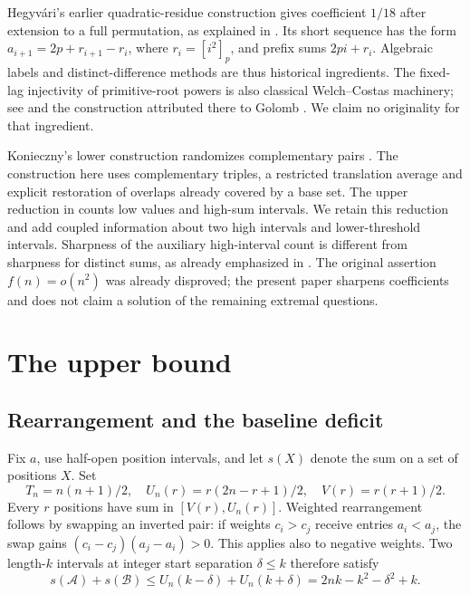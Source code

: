 \documentclass[10pt]{amsart}
\theoremstyle{remark}
\newcommand{\Bset}{\mathcal B}
\newcommand{\Aset}{\mathcal A}
\begin{document}
Hegyv\'ari's earlier quadratic-residue construction
\cite[Theorem~1, pp.~193--194]{Hegyv} gives coefficient $1/18$ after
extension to a full permutation, as explained in
\cite[Section~1.5, p.~417]{Konieczny}. Its short sequence has the form
$a_{i+1}=2p+r_{i+1}-r_i$, where $r_i=[i^2]_p$, and prefix sums
$2pi+r_i$. Algebraic labels and distinct-difference methods are thus
historical ingredients. The fixed-lag injectivity of primitive-root
powers is also classical Welch--Costas machinery; see
\cite[Theorem~7.29]{Drakakis} and the construction attributed there to
Golomb \cite{Golomb}. We claim no originality for that ingredient.

Konieczny's lower construction randomizes complementary pairs
\cite[Section~4.2, Proposition~4.2]{Konieczny}. The construction here
uses complementary triples, a restricted translation average and
explicit restoration of overlaps already covered by a base set.
The upper reduction in \cite[Section~5.1, (97)]{Konieczny} counts low
values and high-sum intervals. We retain this reduction and add
coupled information about two high intervals and lower-threshold
intervals. Sharpness of the auxiliary high-interval count is different
from sharpness for distinct sums, as already emphasized in
\cite[Remark~5.2]{Konieczny}. The original assertion $f(n)=o(n^2)$ was
already disproved; the present paper sharpens coefficients and does
not claim a solution of the remaining extremal questions.

\section{The upper bound}\label{sec:upper}
\subsection{Rearrangement and the baseline deficit}
Fix $a$, use half-open position intervals, and let $s(X)$ denote the
sum on a set of positions $X$. Set
\[
 T_n=n(n+1)/2,\quad U_n(r)=r(2n-r+1)/2,\quad V(r)=r(r+1)/2.
\]
Every $r$ positions have sum in $[V(r),U_n(r)]$. Weighted
rearrangement follows by swapping an inverted pair: if weights
$c_i>c_j$ receive entries $a_i<a_j$, the swap gains
$(c_i-c_j)(a_j-a_i)>0$. This applies also to negative weights.
Two length-$k$ intervals at integer start separation $\delta\le k$
therefore satisfy
\begin{equation}\label{eq:pair}
 s(\Aset)+s(\Bset)\le U_n(k-\delta)+U_n(k+\delta)
 =2nk-k^2-\delta^2+k.
\end{equation}
\end{document}
